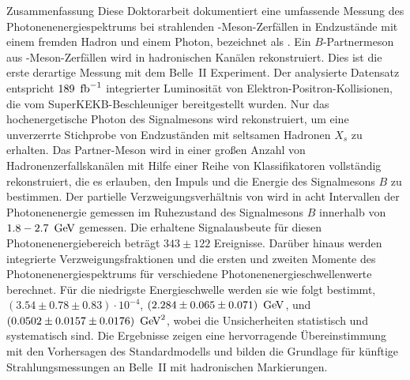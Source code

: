     \begin{abstractpage}{Zusammenfassung}
        Diese Doktorarbeit dokumentiert eine umfassende Messung des Photonenenergiespektrums bei strahlenden \B-Meson-Zerfällen 
        in Endzustände mit einem fremden Hadron und einem Photon, bezeichnet als \BtoXsgamma. 
        Ein $B$-Partnermeson aus \FourS-Meson-Zerfällen wird in hadronischen Kanälen rekonstruiert.
        Dies ist die erste derartige Messung mit dem Belle~II Experiment.
        Der analysierte Datensatz entspricht $189~\mbox{\,fb}^{-1}$ integrierter Luminosität von Elektron-Positron-Kollisionen, die vom SuperKEKB-Beschleuniger bereitgestellt wurden.
        Nur das hochenergetische Photon des Signalmesons \B wird rekonstruiert, um eine unverzerrte Stichprobe von Endzuständen mit seltsamen Hadronen $X_s$ zu erhalten.
        Das Partner-Meson \B wird in einer gro{\ss}en Anzahl von Hadronenzerfallskanälen mit Hilfe einer Reihe von Klassifikatoren vollständig rekonstruiert,
        die es erlauben, den Impuls und die Energie des Signalmesons $B$ zu bestimmen.
        Der partielle Verzweigungsverh\"altnis von \BtoXsgamma wird in acht Intervallen der Photonenenergie gemessen 
        im Ruhezustand des Signalmesons $B$ innerhalb von $1.8-2.7~\mathrm{\,Ge\kern -0.1em V}$ gemessen.
        Die erhaltene Signalausbeute für diesen Photonenenergiebereich beträgt $343 \pm 122$ Ereignisse. 
        Darüber hinaus werden integrierte Verzweigungsfraktionen und die ersten und zweiten Momente des Photonenenergiespektrums für verschiedene Photonenenergieschwellenwerte berechnet.
        Für die niedrigste Energieschwelle werden sie wie folgt bestimmt, 
        $(3.54 \pm 0.78 \pm 0.83)\cdot10^{-4}$,
        $(2.284 \pm 0.065 \pm 0.071)~\mathrm{\,Ge\kern -0.1em V}$,
        und $(0.0502 \pm 0.0157 \pm 0.0176)~\mathrm{\,Ge\kern -0.1em V}^2$,
        wobei die Unsicherheiten statistisch und systematisch sind.
        Die Ergebnisse zeigen eine hervorragende Übereinstimmung mit den Vorhersagen des Standardmodells und bilden die Grundlage für künftige Strahlungsmessungen an Belle~II mit hadronischen Markierungen.
    \end{abstractpage}
    
